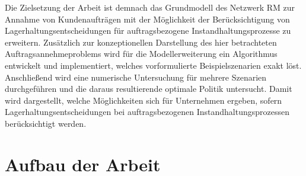 
Die Zielsetzung der Arbeit ist demnach das Grundmodell des Netzwerk RM zur Annahme von Kundenaufträgen mit der Möglichkeit der Berücksichtigung von Lagerhaltungsentscheidungen für auftragsbezogene Instandhaltungsprozesse zu erweitern. Zusätzlich zur konzeptionellen Darstellung des hier betrachteten Auftragsannehmeproblems wird für die Modellerweiterung ein Algorithmus entwickelt und implementiert, welches vorformulierte Beispielszenarien exakt löst. Anschließend wird eine numerische Untersuchung für mehrere Szenarien durchgeführen und die daraus resultierende optimale Politik untersucht. Damit wird dargestellt, welche Möglichkeiten sich für Unternehmen ergeben, sofern Lagerhaltungsentscheidungen bei auftragsbezogenen Instandhaltungsprozessen berücksichtigt werden.

\section{Aufbau der Arbeit}

